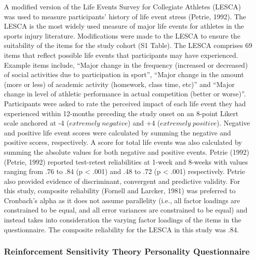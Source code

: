 \documentclass[
  english,
  man,floatsintext]{apa6}
\begin{document}
A modified version of the Life Events Survey for Collegiate Athletes (LESCA) was used to measure participants' history of life event stress (Petrie, 1992).
The LESCA is the most widely used measure of major life events for athletes in the sports injury literature.
Modifications were made to the LESCA to ensure the suitability of the items for the study cohort (S1 Table).
The LESCA comprises 69 items that reflect possible life events that participants may have experienced. Example items include, ``Major change in the frequency (increased or decreased) of social activities due to participation in sport'', ``Major change in the amount (more or less) of academic activity (homework, class time, etc)'' and ``Major change in level of athletic performance in actual competition (better or worse)''. Participants were asked to rate the perceived impact of each life event they had experienced within 12-months preceding the study onset on an 8-point Likert scale anchored at -4 (\(extremely\;negative\)) and +4 (\(extremely\;positive\)).
Negative and positive life event scores were calculated by summing the negative and positive scores, respectively. A score for total life events was also calculated by summing the absolute values for both negative and positive events.
Petrie (1992) (Petrie, 1992) reported test-retest reliabilities at 1-week and 8-weeks with values ranging from .76 to .84 (p \textless{} .001) and .48 to .72 (p \textless{} .001) respectively. Petrie also provided evidence of discriminant, convergent and predictive validity. For this study, composite reliability (Fornell and Larcker, 1981) was preferred to Cronbach's alpha as it does not assume parallelity (i.e., all factor loadings are constrained to be equal, and all error variances are constrained to be equal) and instead takes into consideration the varying factor loadings of the items in the questionnaire. The composite reliability for the LESCA in this study was .84.

\hypertarget{reinforcement-sensitivity-theory-personality-questionnaire}{%
\subsubsection{Reinforcement Sensitivity Theory Personality Questionnaire}\label{reinforcement-sensitivity-theory-personality-questionnaire}}
\end{document}
